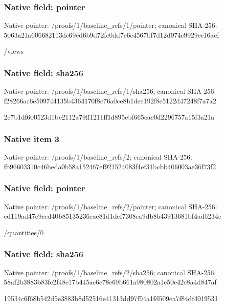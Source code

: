 \documentclass[10pt,a4paper]{article}
\begin{document}
\subsubsection{Native field: pointer}
Native pointer: /proofs/1/baseline\_\allowbreak{}refs/1/pointer; canonical SHA-256: 5063a21a606682113dc69ed6b9d72fe0dd7e6e4567bf7d12d974c9929ec16acf

\begingroup\raggedright\sloppy /\allowbreak{}views\par\endgroup

\subsubsection{Native field: sha256}
Native pointer: /proofs/1/baseline\_\allowbreak{}refs/1/sha256; canonical SHA-256: f28266ac6e509744135b4364170f8c76a0ce8b1dee192f8c5122d47248f7a7a2

\begingroup\raggedright\sloppy 2c7b1df600523d1be2112a79ff1211ff1d895ebf665cae0d2296757a15f3a21a\par\endgroup

\subsubsection{Native item 3}
Native pointer: /proofs/1/baseline\_\allowbreak{}refs/2; canonical SHA-256: fb96603310c46beda0b58a152467ef921524083f4ef31bcbb406003ae36f73f2

\subsubsection{Native field: pointer}
Native pointer: /proofs/1/baseline\_\allowbreak{}refs/2/pointer; canonical SHA-256: cd119ad47e9ced40b85135236eae81d1dcf7308ea9db8b43913681bf4ad6234c

\begingroup\raggedright\sloppy /\allowbreak{}quantities/\allowbreak{}0\par\endgroup

\subsubsection{Native field: sha256}
Native pointer: /proofs/1/baseline\_\allowbreak{}refs/2/sha256; canonical SHA-256: 58af2b3883b83fc2f48e17b445ae6c78e69b661a980802a1e50e42e8a4d847af

\begingroup\raggedright\sloppy 19534c6f68b542d5e3883b8d52516e41313dd97f94a1fd509ea7f84df4019531\par\endgroup
\end{document}
